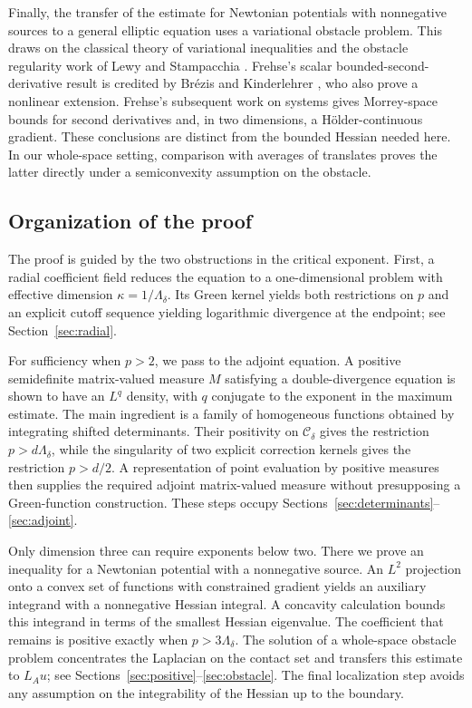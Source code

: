 \documentclass[11pt,a4paper,reqno]{amsart}
\theoremstyle{plain}
\theoremstyle{remark}
\numberwithin{equation}{section}
\newcommand{\Cdelta}{\mathcal C_\delta}
\newcommand{\lam}{\Lambda_\delta}
\begin{document}
Finally, the transfer of the estimate for Newtonian potentials with nonnegative sources to a general elliptic equation uses a variational obstacle problem. This draws on the classical theory of variational inequalities \cite{LionsStampacchia1967} and the obstacle regularity work of Lewy and Stampacchia \cite{LewyStampacchia1969,LewyStampacchia1970}. Frehse's scalar bounded-second-derivative result \cite{Frehse1972} is credited by Br\'ezis and Kinderlehrer \cite[p.~831 and reference~5, p.~844]{BrezisKinderlehrer1974}, who also prove a nonlinear extension. Frehse's subsequent work on systems \cite[Theorem and Corollary, p.~424]{Frehse1973} gives Morrey-space bounds for second derivatives and, in two dimensions, a H\"older-continuous gradient. These conclusions are distinct from the bounded Hessian needed here. In our whole-space setting, comparison with averages of translates proves the latter directly under a semiconvexity assumption on the obstacle.

\subsection{Organization of the proof}
The proof is guided by the two obstructions in the critical exponent. First, a radial coefficient field reduces the equation to a one-dimensional problem with effective dimension $\kappa=1/\lam$. Its Green kernel yields both restrictions on $p$ and an explicit cutoff sequence yielding logarithmic divergence at the endpoint; see Section~\ref{sec:radial}.

For sufficiency when $p>2$, we pass to the adjoint equation. A positive semidefinite matrix-valued measure $M$ satisfying a double-divergence equation is shown to have an $L^q$ density, with $q$ conjugate to the exponent in the maximum estimate. The main ingredient is a family of homogeneous functions obtained by integrating shifted determinants. Their positivity on $\Cdelta$ gives the restriction $p>d\lam$, while the singularity of two explicit correction kernels gives the restriction $p>d/2$. A representation of point evaluation by positive measures then supplies the required adjoint matrix-valued measure without presupposing a Green-function construction. These steps occupy Sections~\ref{sec:determinants}--\ref{sec:adjoint}.

Only dimension three can require exponents below two. There we prove an inequality for a Newtonian potential with a nonnegative source. An $L^2$ projection onto a convex set of functions with constrained gradient yields an auxiliary integrand with a nonnegative Hessian integral. A concavity calculation bounds this integrand in terms of the smallest Hessian eigenvalue. The coefficient that remains is positive exactly when $p>3\lam$. The solution of a whole-space obstacle problem concentrates the Laplacian on the contact set and transfers this estimate to $L_Au$; see Sections~\ref{sec:positive}--\ref{sec:obstacle}. The final localization step avoids any assumption on the integrability of the Hessian up to the boundary.
\end{document}
